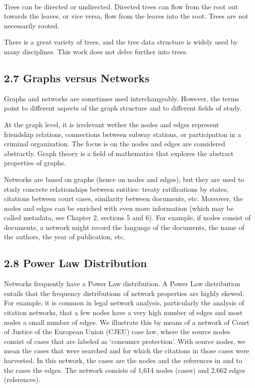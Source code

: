     \begin{center}
    \end{center}
    { \hspace*{\fill} \\}
    
    Trees can be directed or undirected. Directed trees can flow from the
root out towards the leaves, or vice versa, flow from the leaves into
the root. Trees are not necessarily rooted.

There is a great variety of trees, and the tree data structure is widely
used by many disciplines. This work does not delve further into trees.

    \hypertarget{graphs-versus-networks}{%
\subsection{2.7 Graphs versus Networks}\label{graphs-versus-networks}}

Graphs and networks are sometimes used interchangeably. However, the
terms point to different aspects of the graph structure and to different
fields of study.

At the graph level, it is irrelevant wether the nodes and edges
represent friendship relations, connections between subway stations, or
participation in a criminal organization. The focus is on the nodes and
edges are considered abstractly. Graph theory is a field of mathematics
that explores the abstract properties of graphs.

Networks are based on graphs (hence on nodes and edges), but they are
used to study concrete relationships between entities: treaty
ratifications by states, citations between court cases, similarity
between documents, etc. Moreover, the nodes and edges can be enriched
with even more information (which may be called metadata, see Chapter 2,
sections 5 and 6). For example, if nodes consist of documents, a network
might record the language of the documents, the name of the authors, the
year of publication, etc.

    \hypertarget{power-law-distribution}{%
\subsection{2.8 Power Law Distribution}\label{power-law-distribution}}

Networks frequently have a Power Law distribution. A Power Law
distribution entails that the frequency distributions of network
properties are highly skewed. For example, it is common in legal network
analysis, particularly the analysis of citation networks, that a few
nodes have a very high number of edges and most nodes a small number of
edges. We illustrate this by means of a network of Court of Justice of
the European Union (CJEU) case law, where the source nodes consist of
cases that are labeled as `consumer protection'. With source nodes, we
mean the cases that were searched and for which the citations in those
cases were harvested. In this network, the cases are the nodes and the
references in and to the cases the edges. The network consists of 1,614
nodes (cases) and 2,662 edges (references).

